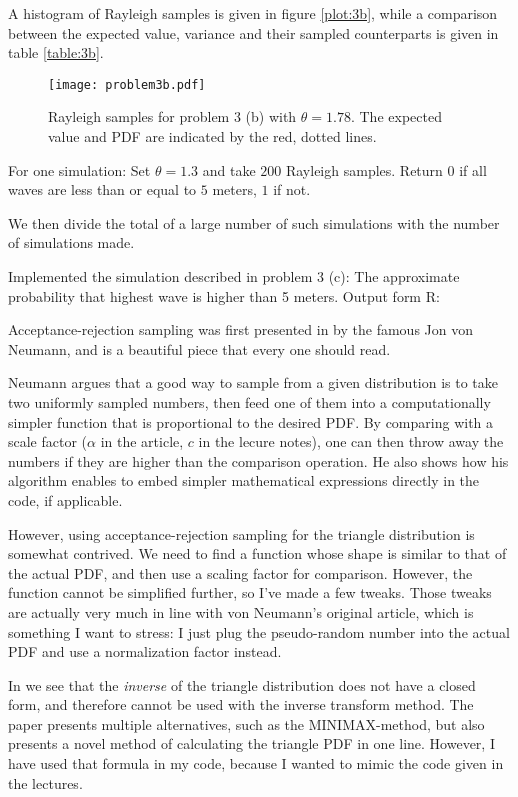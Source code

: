 \documentclass[a4paper,english,12pt]{article}
\begin{document}
A histogram of Rayleigh samples is given in figure \vref{plot:3b}, while a
comparison between the expected value, variance and their sampled counterparts
is given in table \vref{table:3b}.



\begin{figure}
  \centering
  \texttt{[image: problem3b.pdf]}
  \caption{Rayleigh samples for problem 3 (b) with $\theta=1.78$. The expected
  value and PDF are indicated by the red, dotted lines.}
  \label{plot:3b}
\end{figure}

For one simulation: Set $\theta=1.3$ and take $200$ Rayleigh samples. Return
$0$ if all waves are less than or equal to $5$ meters, $1$ if not.

We then divide the total of a large number of such simulations with the number
of simulations made.

\label{problem:3d}
Implemented the simulation described in problem 3 (c): The approximate
probability that highest wave is higher than 5 meters. Output form R:

Acceptance-rejection sampling was first presented in \cite{von1961various} by the
famous Jon von Neumann, and is a beautiful piece that every one should read.

Neumann argues that a good way to sample from a given distribution is to take
two uniformly sampled numbers, then feed one of them into a computationally
simpler function that is proportional to the desired PDF. By comparing with a
scale factor ($\alpha$ in the article, $c$ in the lecure notes), one can then
throw away the numbers if they are higher than the comparison operation. He
also shows how his algorithm enables to embed simpler mathematical expressions
directly in the code, if applicable.

However, using acceptance-rejection sampling for the triangle distribution is
somewhat contrived. We need to find a function whose shape is similar to that
of the actual PDF, and then use a scaling factor for comparison. However, the
function cannot be simplified further, so I've made a few tweaks. Those tweaks
are actually very much in line with von Neumann's original article, which is
something I want to stress: I just plug the pseudo-random number into the
actual PDF and use a normalization factor instead.

In \cite{STEIN20091143} we see that the \textit{inverse} of the triangle
distribution does not have a closed form, and therefore cannot be used with the
inverse transform method. The paper presents multiple alternatives, such as the
MINIMAX-method, but also presents a novel method of calculating the triangle
PDF in one line. However, I have used that formula in my code, because I wanted
to mimic the code given in the lectures.
\end{document}
